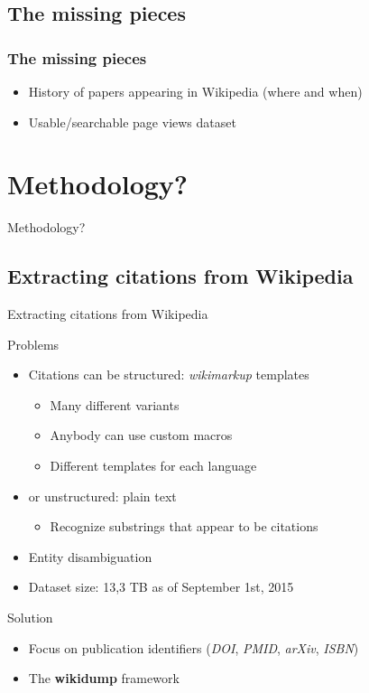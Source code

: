 \documentclass{beamer}
\begin{document}
\subsection{The missing pieces}
\begin{frame}
\frametitle{The missing pieces}
\begin{itemize}
    \item History of papers appearing in Wikipedia (where and when)
    \item Usable/searchable page views dataset
\end{itemize}
\end{frame}

\section{Methodology?}

\begin{frame}[c]
\Huge{\centerline{Methodology?}}
\end{frame}

\subsection{Extracting citations from Wikipedia}
\begin{frame}{Extracting citations from Wikipedia}
    \begin{block}{Problems}
        \begin{itemize}
            \item Citations can be structured: \emph{wikimarkup} templates
            \begin{itemize}
                \item Many different variants
                \item Anybody can use custom macros
                \item Different templates for each language
            \end{itemize}
            \item or unstructured: plain text
            \begin{itemize}
                \item Recognize substrings that appear to be citations
            \end{itemize}
            \item Entity disambiguation
            \item Dataset size: 13,3 TB as of September 1st, 2015
        \end{itemize}
    \end{block}
    \begin{block}{Solution}
        \begin{itemize}
            \item Focus on publication identifiers (\emph{DOI}, \emph{PMID}, \emph{arXiv}, \emph{ISBN})
            \item The \textbf{wikidump} framework
        \end{itemize}
    \end{block}
\end{frame}
\end{document}
